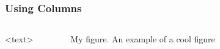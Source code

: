 \documentclass[10pt]{beamer}
\begin{document}
		\begin{frame}
			\frametitle{Using Columns}
			\begin{columns}
					<text>
					\centering
					\begin{figure}[!htb]
					\caption{\label{fig:fig1} My figure.  An example of a cool figure}
				\end{figure}
			\end{columns}
		\end{frame}
		
\end{document}
